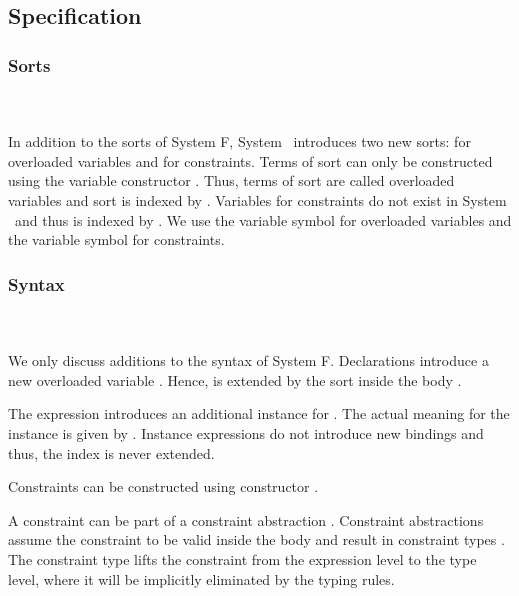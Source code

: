 \subsection{Specification}

\subsubsection{Sorts}\hfill\\\\
In addition to the sorts of System F, System \Fo\ introduces two new sorts:  for overloaded variables and  for constraints.
\FoSort
Terms of sort  can only be constructed using the variable constructor . Thus, terms of sort  are called overloaded variables and sort  is indexed by .
Variables for constraints do not exist in System \Fo\ and thus  is indexed by . 
We use the variable symbol  for overloaded variables and the variable symbol  for constraints. 

\subsubsection{Syntax}\hfill\\\\
We only discuss additions to the syntax of System F.
\newpage
\FoTerm
Declarations   introduce a new overloaded variable . 
Hence,  is extended by the sort  inside the body . 

\noindent The expression   \Constr{=}    introduces an additional instance for . 
The actual meaning for the instance is given by .
Instance expressions do not introduce new bindings and thus, the index  is never extended.

\noindent Constraints  can be constructed using constructor  \Constr{:} . 

\noindent A constraint  can be part of a constraint abstraction \Constr{\lambdabar}   . Constraint abstractions assume the constraint  to be valid inside the body  and result in constraint types \Constr{[}  \Constr{]⇒} . The constraint type lifts the constraint from the expression level to the type level, where it will be implicitly eliminated by the typing rules.

